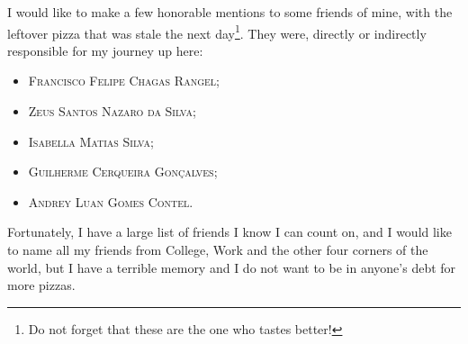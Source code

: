 I would like to make a few honorable mentions to some friends of mine, with the leftover pizza that was stale the next day\footnote{Do not forget that these are the one who tastes better!}. They were, directly or indirectly responsible for my journey up here: 
	\begin{itemize}
		\item \textsc{Francisco Felipe Chagas Rangel};
		\item \textsc{Zeus Santos Nazaro da Silva};\item \textsc{Isabella Matias Silva};
		\item \textsc{Guilherme Cerqueira Gonçalves}; \item \textsc{Andrey Luan Gomes Contel}.
	\end{itemize}
\thispagestyle{empty}
Fortunately, I have a large list of friends I know I can count on, and I would like to name all my friends from College, Work and the other four corners of the world, but I have a terrible memory and I do not want to be in anyone's debt for more pizzas.
